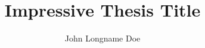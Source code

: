\documentclass[
  doctype=phd,      %
  school=fctunl,    %
  docstyle=elegant, %
	lang=en,          %
  coverlang=en,     %
	linkscolor=darkblue,  %
	spine=false,			%
	biblatex={        %
		style=numeric,  %
		sorting=nyt,		%
		firstinits=true,  %
		sortcites=true, %
	},
	memoir={a4paper, 11pt, draft},	%
]{unlthesis}
\title{Impressive Thesis Title}
\author[m]{John Longname Doe}
\begin{document}
\thesisfrontmatter	%

\coverpage		%
\printcopyright		%
\printdedicatory	%
\printacknowledgements	%
\printquote		%
\printabstract		%
\tableofcontents* 	%
\printotherlists 	%


\thesismainmatter	%

\printchapthers		%
\printbib		%
\printappendixes	%

\end{document}
